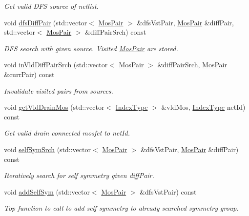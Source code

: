 \begin{DoxyCompactItemize}
\begin{DoxyCompactList}\small\item\em Get valid D\+FS source of netlist. \end{DoxyCompactList}\item 
void \hyperlink{classSymDetect_acd33a2c834493240fc4e8840819d676c}{dfs\+Diff\+Pair} (std\+::vector$<$ \hyperlink{classMosPair}{Mos\+Pair} $>$ \&dfs\+Vst\+Pair, \hyperlink{classMosPair}{Mos\+Pair} \&diff\+Pair, std\+::vector$<$ \hyperlink{classMosPair}{Mos\+Pair} $>$ \&diff\+Pair\+Srch) const
\begin{DoxyCompactList}\small\item\em D\+FS search with given source. Visited \hyperlink{classMosPair}{Mos\+Pair} are stored. \end{DoxyCompactList}\item 
void \hyperlink{classSymDetect_ae6a1ba27f6768f215cba0623b6e2ce08}{in\+Vld\+Diff\+Pair\+Srch} (std\+::vector$<$ \hyperlink{classMosPair}{Mos\+Pair} $>$ \&diff\+Pair\+Srch, \hyperlink{classMosPair}{Mos\+Pair} \&curr\+Pair) const
\begin{DoxyCompactList}\small\item\em Invalidate visited pairs from sources. \end{DoxyCompactList}\item 
void \hyperlink{classSymDetect_a48c23173bf5e56c3aa11ac306715cba2}{get\+Vld\+Drain\+Mos} (std\+::vector$<$ \hyperlink{type_8h_a581e8093e28e7362f2b6937296190676}{Index\+Type} $>$ \&vld\+Mos, \hyperlink{type_8h_a581e8093e28e7362f2b6937296190676}{Index\+Type} net\+Id) const
\begin{DoxyCompactList}\small\item\em Get valid drain connected mosfet to net\+Id. \end{DoxyCompactList}\item 
void \hyperlink{classSymDetect_ab6f286024b013fa257295111016da18b}{self\+Sym\+Srch} (std\+::vector$<$ \hyperlink{classMosPair}{Mos\+Pair} $>$ \&dfs\+Vst\+Pair, \hyperlink{classMosPair}{Mos\+Pair} \&diff\+Pair) const
\begin{DoxyCompactList}\small\item\em Iteratively search for self symmetry given diff\+Pair. \end{DoxyCompactList}\item 
void \hyperlink{classSymDetect_ac3075fde17fa6c33093a683b18f17086}{add\+Self\+Sym} (std\+::vector$<$ \hyperlink{classMosPair}{Mos\+Pair} $>$ \&dfs\+Vst\+Pair) const
\begin{DoxyCompactList}\small\item\em Top function to call to add self symmetry to already searched symmetry group. \end{DoxyCompactList}\item 

\end{DoxyCompactItemize}

